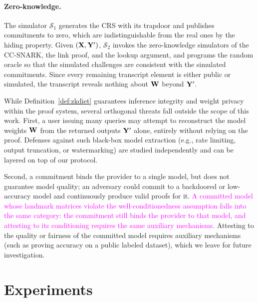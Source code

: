 \documentclass[sigconf,anonymous,review,balance=false]{acmart}
\newcommand{\rev}[1]{{\color{magenta}#1}}
\begin{document}
{\paragraph{Zero-knowledge.}
The simulator $\mathcal{S}_1$ generates the CRS with its trapdoor and
publishes commitments to zero, which are indistinguishable from the real
ones by the hiding property. Given $({\mathbf{X}}, {\mathbf{Y}}')$, $\mathcal{S}_2$ invokes the
zero-knowledge simulators of the CC-SNARK, the link proof, and the lookup
argument, and programs the random oracle so that the simulated challenges
are consistent with the simulated commitments. Since every remaining
transcript element is either public or simulated, the transcript reveals
nothing about ${\mathbf{W}}$ beyond ${\mathbf{Y}}'$.
}%

\label{subsec:out-of-scope}
While Definition~\ref{def:zkdiet} guarantees inference integrity and weight privacy within the proof system, several orthogonal threats fall outside the scope of this work. First, a user issuing many queries may attempt to reconstruct the model weights \rev{${\mathbf{W}}$} from the returned outputs ${\mathbf{Y}}'$ alone, entirely without relying on the proof. Defenses against such black-box model extraction (e.g., rate limiting, output truncation, or watermarking) are studied independently and can be layered on top of our protocol.

Second, a commitment binds the provider to a single model, but does not guarantee model quality; an adversary could commit to a backdoored or low-accuracy model and continuously produce valid proofs for it. \textcolor{magenta}{A committed model whose landmark matrices violate the well-conditionedness assumption falls into the same category: the commitment still binds the provider to that model, and attesting to its conditioning requires the same auxiliary mechanisms.} Attesting to the quality or fairness of the committed model requires auxiliary mechanisms (such as proving accuracy on a public labeled dataset), which we leave for future investigation.

\section{Experiments}
\label{sec:experiments}
\end{document}
